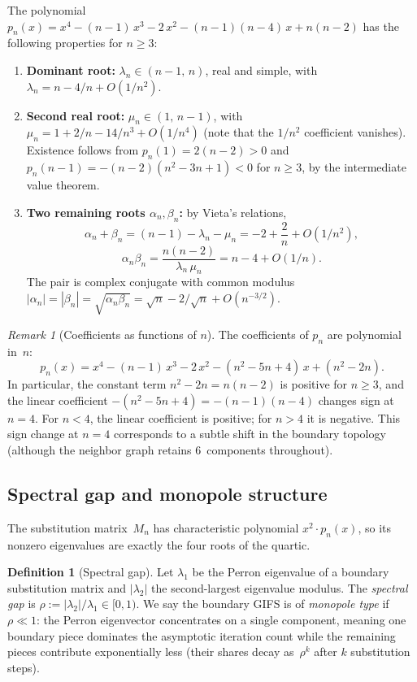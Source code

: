 \documentclass{amsart}
\theoremstyle{definition}
\newtheorem{definition}[theorem]{Definition}
\theoremstyle{remark}
\newtheorem{remark}[theorem]{Remark}
\begin{document}
The polynomial $p_n(x) = x^4 - (n{-}1)\,x^3 - 2\,x^2 - (n{-}1)(n{-}4)\,x + n(n{-}2)$
has the following properties for $n \ge 3$:

\begin{enumerate}
\item \textbf{Dominant root:} $\lambda_n \in (n{-}1,\, n)$, real and simple,
with $\lambda_n = n - 4/n + O(1/n^2)$.
\item \textbf{Second real root:} $\mu_n \in (1,\, n{-}1)$, with
$\mu_n = 1 + 2/n - 14/n^3 + O(1/n^4)$ (note that the $1/n^2$
coefficient vanishes).  Existence follows from $p_n(1) = 2(n{-}2) > 0$
and $p_n(n{-}1) = -(n{-}2)(n^2{-}3n{+}1) < 0$ for $n \ge 3$, by the
intermediate value theorem.
\item \textbf{Two remaining roots $\alpha_n, \beta_n$:} by Vieta's
relations,
\[
  \alpha_n + \beta_n = (n{-}1) - \lambda_n - \mu_n
                     = -2 + \frac{2}{n} + O(1/n^2),
\]
\[
  \alpha_n \beta_n = \frac{n(n{-}2)}{\lambda_n\, \mu_n}
                   = n - 4 + O(1/n).
\]
The pair is complex conjugate with common modulus
$|\alpha_n| = |\beta_n| = \sqrt{\alpha_n \beta_n} = \sqrt{n} - 2/\sqrt{n} + O(n^{-3/2})$.
\end{enumerate}

\begin{remark}[Coefficients as functions of $n$]
The coefficients of $p_n$ are polynomial in~$n$:
\[
  p_n(x) = x^4 - (n{-}1)\,x^3 - 2\,x^2 - (n^2{-}5n{+}4)\,x + (n^2{-}2n).
\]
In particular, the constant term $n^2 - 2n = n(n{-}2)$ is positive for
$n \ge 3$, and the linear coefficient $-(n^2{-}5n{+}4) =
-(n{-}1)(n{-}4)$ changes sign at $n = 4$.  For $n < 4$, the linear
coefficient is positive; for $n > 4$ it is negative.  This sign change
at $n = 4$ corresponds to a subtle shift in the boundary topology
(although the neighbor graph retains $6$~components throughout).
\end{remark}

\subsection{Spectral gap and monopole structure}
\label{ssec:spectral}

The substitution matrix~$M_n$ has characteristic polynomial
$x^2 \cdot p_n(x)$, so its nonzero eigenvalues are exactly the
four roots of the quartic.

\begin{definition}[Spectral gap]\label{def:spectral-gap}
Let $\lambda_1$ be the Perron eigenvalue of a boundary substitution
matrix and $|\lambda_2|$ the second-largest eigenvalue modulus.  The
\emph{spectral gap} is $\rho := |\lambda_2|/\lambda_1 \in [0,1)$.
We say the boundary GIFS is of \emph{monopole type} if
$\rho \ll 1$: the Perron eigenvector concentrates on a single
component, meaning one boundary piece dominates the asymptotic
iteration count while the remaining pieces contribute
exponentially less (their shares decay as~$\rho^k$ after $k$
substitution steps).
\end{definition}
\end{document}
